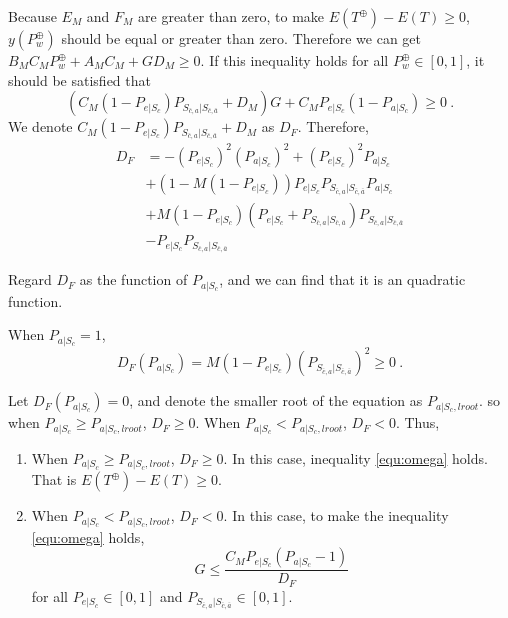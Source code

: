 Because $E_{M}$ and $F_{M}$ are greater than zero, to make $E(T^{\oplus}) - E(T) \geq 0$, $y(P_{w}^{\oplus})$ should be equal or greater than zero.
Therefore we can get $ B_{M}C_{M}P_{w}^{\oplus}+A_{M}C_{M}+GD_{M} \geq 0$.
If this inequality holds for all $P_{w}^{\oplus} \in [0,1]$, it should be satisfied that
\begin{equation}\label{equ:omega}
  (C_{M}(1-P_{e|S_{c}})P_{S_{\bar{c}, a}|S_{\bar{c},\bar{a}}}+D_{M})G+C_{M}P_{e|S_{c}}(1-P_{a|S_{c}}) \geq 0 \ .
\end{equation}
We denote $C_{M}(1-P_{e|S_{c}})P_{S_{\bar{c}, a}|S_{\bar{c},\bar{a}}}+D_{M}$ as $D_{F}$.
Therefore,
\begin{equation}
\begin{split}
D_{F} &=-(P_{e|S_{c}})^2(P_{a|S_{c}})^2+(P_{e|S_{c}})^2P_{a|S_{c}}  \\
&+(1-M(1-P_{e|S_{c}}))P_{e|S_{c}}P_{S_{\bar{c}, a}|S_{\bar{c},\bar{a}}}P_{a|S_{c}}\\
&+M(1-P_{e|S_{c}})(P_{e|S_{c}}+P_{S_{\bar{c}, a}|S_{\bar{c},\bar{a}}})P_{S_{\bar{c}, a}|S_{\bar{c},\bar{a}}}\\
&-P_{e|S_{c}}P_{S_{\bar{c}, a}|S_{\bar{c},\bar{a}}}
\end{split}\end{equation}

Regard $D_{F}$ as the function of $P_{a|S_{c}}$,
and we can find that it is an quadratic function.

When $P_{a|S_{c}} = 1$,
$$D_{F}(P_{a|S_{c}})=M(1-P_{e|S_{c}})(P_{S_{\bar{c}, a}|S_{\bar{c},\bar{a}}})^2 \geq 0 \ .$$

Let $D_{F}(P_{a|S_{c}}) = 0$,
 and denote the smaller root of the equation as $P_{a|S_{c},lroot}$.
  so when $P_{a|S_{c}} \geq P_{a|S_{c},lroot}$, $D_{F} \geq 0$.
   When $P_{a|S_{c}} < P_{a|S_{c},lroot}$, $D_{F} < 0$.
 Thus,
\begin{enumerate}
  \item
  When $P_{a|S_{c}} \geq P_{a|S_{c},lroot}$, $D_{F} \geq 0$.
  In this case, inequality \ref{equ:omega} holds. That is $E(T^{\oplus}) - E(T) \geq 0$.
  \item
  When $P_{a|S_{c}} < P_{a|S_{c},lroot}$, $D_{F} < 0$.
   In this case, to make the inequality \ref{equ:omega} holds,
   \begin{equation}\label{equ:ge}
     G \leq \frac{C_{M}P_{e|S_{c}}(P_{a|S_{c}}-1)}{D_{F}}
   \end{equation}
    for all $P_{e|S_{c}} \in [0,1]$ and $P_{S_{\bar{c}, a}|S_{\bar{c},\bar{a}}} \in [0,1]$.
\end{enumerate}

